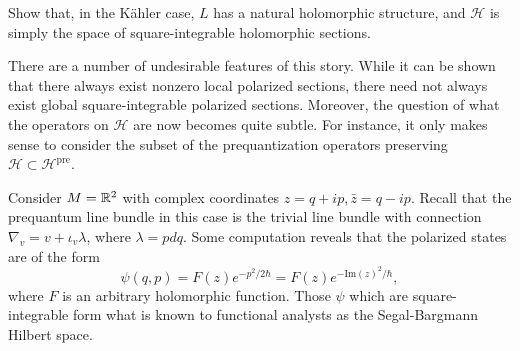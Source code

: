 \documentclass{amsart}
\begin{document}
\begin{exercise}
    Show that, in the K\"ahler case, $L$ has a natural holomorphic structure, and $\mathcal{H}$
    is simply the space of square-integrable holomorphic sections.
\end{exercise}

There are a number of undesirable features of this story.
While it can be shown that there always exist nonzero local polarized sections, there need not always exist
global square-integrable polarized sections.  Moreover, the question of what the operators on $\mathcal{H}$
are now becomes quite subtle.
For instance, it only makes sense to consider the subset of the prequantization operators
preserving $\mathcal{H}\subset\mathcal{H}^\text{pre}$.

\begin{example}
    Consider $M=\mathbb{R}^2$ with complex coordinates $z=q+ip, \bar z=q-ip$. Recall that the
    prequantum line bundle in this case is the trivial line bundle with connection $\nabla_v = v+\iota_v\lambda$,
    where $\lambda=pdq$. Some computation reveals that the polarized states are of the form
    \begin{equation*}
        \psi(q,p) = F(z)e^{-p^2/2\hbar} = F(z)e^{-\text{Im}(z)^2/\hbar},
    \end{equation*}
    where $F$ is an arbitrary holomorphic function. Those $\psi$ which are square-integrable
    form what is known to functional analysts as the Segal-Bargmann Hilbert space.
\end{example}

\nocite{*}
\printbibliography
\end{document}
